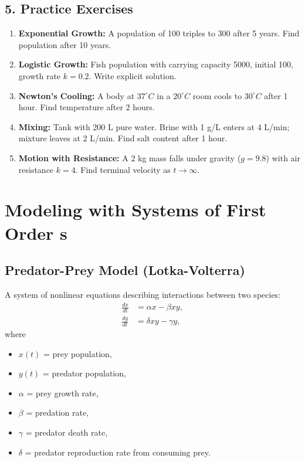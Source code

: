 \subsection*{5. Practice Exercises}
\begin{enumerate}
    \item \textbf{Exponential Growth:} A population of 100 triples to 300 after 5 years. Find population after 10 years.
    \item \textbf{Logistic Growth:} Fish population with carrying capacity 5000, initial 100, growth rate $k=0.2$. Write explicit solution.
    \item \textbf{Newton's Cooling:} A body at $37^\circ C$ in a $20^\circ C$ room cools to $30^\circ C$ after 1 hour. Find temperature after 2 hours.
    \item \textbf{Mixing:} Tank with 200 L pure water. Brine with 1 g/L enters at 4 L/min; mixture leaves at 2 L/min. Find salt content after 1 hour.
    \item \textbf{Motion with Resistance:} A 2 kg mass falls under gravity ($g=9.8$) with air resistance $k=4$. Find terminal velocity as $t\to\infty$.
\end{enumerate}


\section{Modeling with Systems of First Order \ode{}s}
  \subsection*{Predator-Prey Model (Lotka-Volterra)}
  A system of nonlinear equations describing interactions between two species:
  \[
  \begin{aligned}
  \frac{dx}{dt} &= \alpha x - \beta xy, \\
  \frac{dy}{dt} &= \delta xy - \gamma y,
  \end{aligned}
  \]
  where 
  \begin{itemize}
      \item $x(t)$ = prey population,
      \item $y(t)$ = predator population,
      \item $\alpha$ = prey growth rate,
      \item $\beta$ = predation rate,
      \item $\gamma$ = predator death rate,
      \item $\delta$ = predator reproduction rate from consuming prey.
  \end{itemize}


